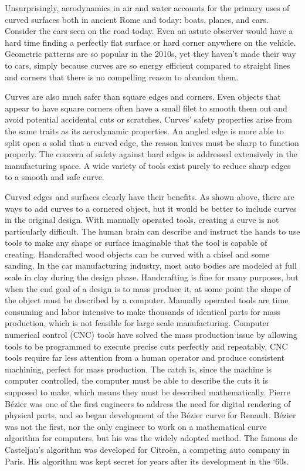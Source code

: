 \documentclass[12pt,letterpaper]{article}
\begin{document}
Unsurprisingly, aerodynamics in air and water accounts for the primary uses of curved surfaces both in ancient Rome and today: boats, planes, and cars. Consider the cars seen on the road today. Even an astute observer would have a hard time finding a perfectly flat surface or hard corner anywhere on the vehicle. Geometric patterns are so popular in the 2010s, yet they haven’t made their way to cars, simply because curves are so energy efficient compared to straight lines and corners that there is no compelling reason to abandon them. 

Curves are also much safer than square edges and corners. Even objects that appear to have square corners often have a small filet to smooth them out and avoid potential accidental cuts or scratches. Curves’ safety properties arise from the same traits as its aerodynamic properties. An angled edge is more able to split open a solid that a curved edge, the reason knives must be sharp to function properly. The concern of safety against hard edges is addressed extensively in the manufacturing space. A wide variety of tools exist purely to reduce sharp edges to a smooth and safe curve.

Curved edges and surfaces clearly have their benefits. As shown above, there are ways to add curves to a cornered object, but it would be better to include curves in the original design. With manually operated tools, creating a curve is not particularly difficult. The human brain can describe and instruct the hands to use tools to make any shape or surface imaginable that the tool is capable of creating. Handcrafted wood objects can be curved with a chisel and some sanding. In the car manufacturing industry, most auto bodies are modeled at full scale in clay during the design phase. Handcrafting is fine for many purposes, but when the end goal of a design is to mass produce it, at some point the shape of the object must be described by a computer. Manually operated tools are time consuming and labor intensive to make thousands of identical parts for mass production, which is not feasible for large scale manufacturing. Computer numerical control (CNC) tools have solved the mass production issue by allowing tools to be programmed to execute precise cuts perfectly and repeatably. CNC tools require far less attention from a human operator and produce consistent machining, perfect for mass production. The catch is, since the machine is computer controlled, the computer must be able to describe the cuts it is supposed to make, which means they must be described mathematically. Pierre B\'ezier was one of the first engineers to address the need for digital rendering of physical parts, and so began development of the B\'ezier curve for Renault. B\'ezier was not the first, nor the only engineer to work on a mathematical curve algorithm for computers, but his was the widely adopted method. The famous de Casteljau’s algorithm was developed for Citroën, a competing auto company in Paris. His algorithm was kept secret for years after its development in the ‘60s. \citep{handbook}
\end{document}

